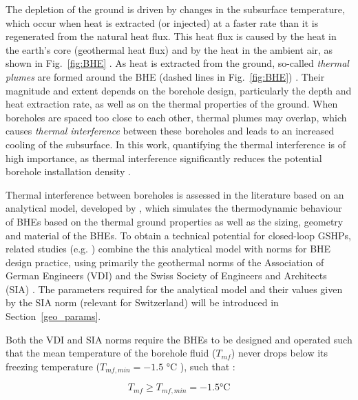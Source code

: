 The depletion of the ground is driven by changes in the subsurface temperature, which occur when heat is extracted (or injected) at a faster rate than it is regenerated from the natural heat flux. This heat flux is caused by the heat in the earth's core (geothermal heat flux) and by the heat in the ambient air, as shown in Fig.~\ref{fig:BHE} \cite{wagner_erdsondenpotenzial_2014}.
As heat is extracted from the ground, so-called \textit{thermal plumes} are formed around the BHE (dashed lines in Fig.~\ref{fig:BHE}) \cite{alcaraz_t-i-ger_2017}. Their magnitude and extent depends on the borehole design, particularly the depth and heat extraction rate, as well as on the thermal properties of the ground.
%
When boreholes are spaced too close to each other, thermal plumes may overlap, which causes \textit{thermal interference} between these boreholes and leads to an increased cooling of the subsurface. In this work, quantifying the thermal interference is of high importance, as thermal interference significantly reduces the potential borehole installation density \cite{bayer_geothermal_2019,miglani_methodology_2018}.

Thermal interference between boreholes is assessed in the literature based on an analytical model, developed by \citet{eskilson_thermal_1987}, which simulates the thermodynamic behaviour of BHEs based on the thermal ground properties as well as the sizing, geometry and material of the BHEs.
%
To obtain a technical potential for closed-loop GSHPs, related studies (e.g. \cite{miglani_methodology_2018,rivera_increased_2017,schiel_gis-based_2016,viesi_gis-supported_2018,casasso_g.pot:_2016,perego_techno-economic_2019}) combine the this analytical model with norms for BHE design practice, using primarily the geothermal norms of the Association of German Engineers (VDI) \cite{vdi_vdi_2019} and the Swiss Society of Engineers and Architects (SIA) \cite{sia_sondes_2010}.
The parameters required for the analytical model and their values given by the SIA norm (relevant for Switzerland) will be introduced in Section~\ref{geo_params}.

Both the VDI and SIA norms require the BHEs to be designed and operated such that the mean temperature of the borehole fluid ($T_{mf}$) never drops below its freezing temperature ($T_\mathit{mf,min}=-1.5$ °C \cite{sia_sondes_2010}), such that \cite{sia_sondes_2010,vdi_vdi_2019}:

\begin{equation}
\label{eq:T_mf_min}
T_{mf} \geq T_\mathit{mf,min} = -1.5 \text{°C}
\end{equation}

